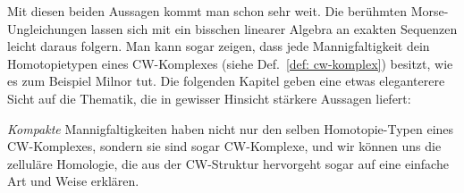 Mit diesen beiden Aussagen kommt man schon sehr weit. Die berühmten Morse- \\Ungleichungen lassen
sich mit ein bisschen linearer Algebra an exakten Sequenzen leicht daraus folgern. Man kann sogar
zeigen, dass jede Mannigfaltigkeit dein Homotopietypen eines CW-Komplexes 
(siehe Def.~\ref{def: cw-komplex}) besitzt, wie es zum Beispiel Milnor tut. Die folgenden Kapitel 
geben eine etwas eleganterere Sicht auf die Thematik, die in gewisser Hinsicht stärkere Aussagen
liefert:

\textit{Kompakte} Mannigfaltigkeiten haben nicht nur den selben Homotopie-Typen eines CW-Komplexes, 
sondern sie sind sogar CW-Komplexe, und wir können uns die zelluläre Homologie, die aus der 
CW-Struktur hervorgeht sogar auf eine einfache Art und Weise erklären.